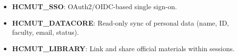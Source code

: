 \begin{itemize}
  \item \textbf{HCMUT\_SSO}: OAuth2/OIDC-based single sign-on.
  \item \textbf{HCMUT\_DATACORE}: Read-only sync of personal data (name, ID, faculty, email, status).
  \item \textbf{HCMUT\_LIBRARY}: Link and share official materials within sessions.
\end{itemize}
